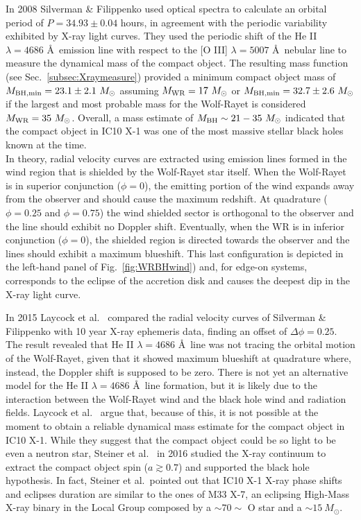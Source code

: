 \documentclass[a4paper,titlepage]{book}     	%
\newcommand{\sun}{\ensuremath{_\odot}}
\newcommand{\msun}{\ensuremath{M\sun}}
\newcommand{\mwr}{\ensuremath{M_\textup{WR}}}
\newcommand{\mbh}{\ensuremath{M_\textup{BH}}}
\begin{document}
In 2008 Silverman \& Filippenko used optical spectra to calculate an orbital period of $P = 34.93 \pm 0.04$ hours, in agreement with the periodic variability exhibited by X-ray light curves. They used the periodic shift of the He II $\lambda=4686$ \AA ~emission line with respect to the [O III] $\lambda=5007$ \AA ~nebular line to measure the dynamical mass of the compact object. The resulting mass function (see Sec.\ \ref{subsec:Xraymeasure}) provided a minimum compact object mass of $M_{\rm BH, min} = 23.1 \pm 2.1~\msun$ assuming $\mwr = 17~\msun$ or $M_{\rm BH, min} = 32.7 \pm 2.6~\msun$ if the largest and most probable mass for the Wolf-Rayet is considered $\mwr = 35~\msun$. Overall, a mass estimate of $\mbh \sim 21-35~\msun$ indicated that the compact object in IC10 X-1 was one of the most massive stellar black holes known at the time. \\

In theory, radial velocity curves are extracted using emission lines formed in the wind region that is shielded by the Wolf-Rayet star itself. When the Wolf-Rayet is in superior conjunction ($\phi = 0$), the emitting portion of the wind expands away from the observer and should cause the maximum redshift. At quadrature ($\phi = 0.25$ and $\phi = 0.75$) the wind shielded sector is orthogonal to the observer and the line should exhibit no Doppler shift. Eventually, when the WR is in inferior conjunction ($\phi = 0$), the shielded region is directed towards the observer and the lines should exhibit a maximum blueshift. This last configuration is depicted in the left-hand panel of Fig.\ \ref{fig:WRBHwind}) and, for edge-on systems, corresponds to the eclipse of the accretion disk and causes the deepest dip in the X-ray light curve.

In 2015 Laycock et al.\ \cite{laycock2015_IC10X1_measuredshift} compared the radial velocity curves of Silverman \& Filippenko with 10 year X-ray ephemeris data, finding an offset of $\Delta \phi = 0.25$. The result revealed that He II $\lambda=4686$ \AA~line was not tracing the orbital motion of the Wolf-Rayet, given that it showed maximum blueshift at quadrature  where, instead, the Doppler shift is supposed to be zero. There is not yet an alternative model for the He II $\lambda=4686$ \AA ~line formation, but it is likely due to the interaction between the Wolf-Rayet wind and the black hole wind and radiation fields. Laycock et al.\ \cite{ICX10X-1_Laycock2015_revisited} argue that, because of this, it is not possible at the moment to obtain a reliable dynamical mass estimate for the compact object in IC10 X-1. While they suggest that the compact object could be so light to be even a neutron star, Steiner et al.\ \cite{IC10X-1?Steiner2016spinBH} in 2016 studied the X-ray continuum to extract the compact object spin ($a \gtrsim 0.7$) and supported the black hole hypothesis. In fact, Steiner et al.\ pointed out that IC10 X-1 X-ray phase shifts and eclipses duration are similar to the ones of M33 X-7, an eclipsing High-Mass X-ray binary in the Local Group composed by a $\sim 70\sim$ O star and a $\sim 15~\msun$.
\end{document}
